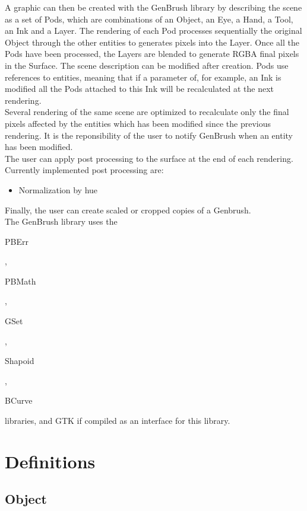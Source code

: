 A graphic can then be created with the GenBrush library by describing the scene as a set of Pods, which are combinations of an Object, an Eye, a Hand, a Tool, an Ink and a Layer. The rendering of each Pod processes sequentially the original Object through the other entities to generates pixels into the Layer. Once all the Pods have been processed, the Layers are blended to generate RGBA final pixels in the Surface. The scene description can be modified after creation. Pods use references to entities, meaning that if a parameter of, for example, an Ink is modified all the Pods attached to this Ink will be recalculated at the next rendering.\\

Several rendering of the same scene are optimized to recalculate only the final pixels affected by the entities which has been modified since the previous rendering. It is the reponsibility of the user to notify GenBrush when an entity has been modified.\\

The user can apply post processing to the surface at the end of each rendering. Currently implemented post processing are:\\
\begin{itemize}
\item Normalization by hue
\end{itemize}

Finally, the user can create scaled or cropped copies of a Genbrush.\\

The GenBrush library uses the \begin{ttfamily}PBErr\end{ttfamily}, \begin{ttfamily}PBMath\end{ttfamily}, \begin{ttfamily}GSet\end{ttfamily}, \begin{ttfamily}Shapoid\end{ttfamily}, \begin{ttfamily}BCurve\end{ttfamily} libraries, and GTK if compiled as an interface for this library.\\

\section{Definitions}

\subsection{Object}

